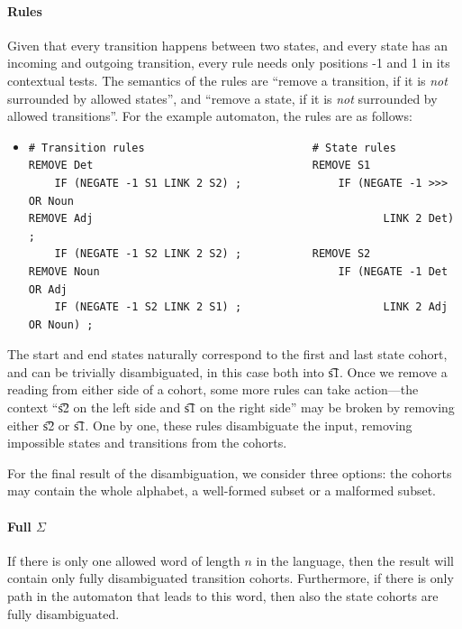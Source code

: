 \paragraph{Rules}
Given that every transition happens between two states, and every state 
has an incoming and outgoing transition, every rule needs only
positions -1 and 1 in its contextual tests. 
The semantics of the rules are ``remove a transition, if it is 
\emph{not} surrounded by allowed states'',
and ``remove a state, if it is \emph{not} surrounded by allowed transitions''.
For the example automaton, the rules are as follows:

\begin{itemize}
\item[]
\begin{verbatim}
# Transition rules                          # State rules
REMOVE Det                                  REMOVE S1          
    IF (NEGATE -1 S1 LINK 2 S2) ;               IF (NEGATE -1 >>> OR Noun
REMOVE Adj                                             LINK 2 Det) ;
    IF (NEGATE -1 S2 LINK 2 S2) ;           REMOVE S2
REMOVE Noun                                     IF (NEGATE -1 Det OR Adj
    IF (NEGATE -1 S2 LINK 2 S1) ;                      LINK 2 Adj OR Noun) ;
\end{verbatim}

\end{itemize}



The start and end states naturally correspond to the first and last
state cohort, and can be trivially disambiguated, in this case both into \t{s1}.
Once we remove a reading from either side of a cohort, some more rules can take
action---the context ``\t{s2} on the left side and \t{s1} on the right side''
may be broken by removing either \t{s2} or \t{s1}. 
One by one, these rules disambiguate the input, removing impossible
states and transitions from the cohorts.



\noindent For the final result of the disambiguation, we consider three options:
the cohorts may contain the whole alphabet, a well-formed subset
or a malformed subset.

\paragraph{Full $\Sigma$}
If there is only one allowed word of length $n$ in the language,
then the result will contain only fully disambiguated transition
cohorts.
Furthermore, if there is only path in the automaton that leads
to this word, then also the state cohorts are fully disambiguated.

